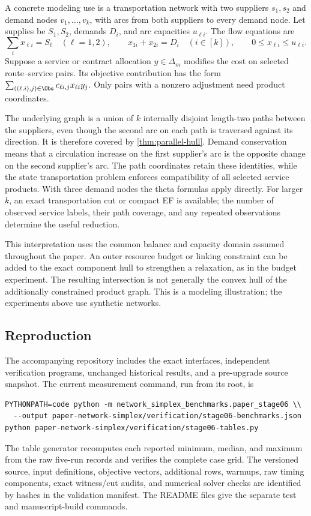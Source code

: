 A concrete modeling use is a transportation network with two suppliers
$s_1,s_2$ and demand nodes $v_1,\ldots,v_k$, with arcs from both suppliers
to every demand node. Let supplies be $S_1,S_2$, demands $D_i$, and
arc capacities $u_{\ell i}$. The flow equations are
\[
 \sum_i x_{\ell i}=S_\ell\quad(\ell=1,2),\qquad
 x_{1i}+x_{2i}=D_i\quad(i\in[k]),\qquad
 0\le x_{\ell i}\le u_{\ell i}.
\]
Suppose a service or contract allocation $y\in\Delta_m$ modifies the
cost on selected route--service pairs. Its objective contribution has the
form $\sum_{((\ell,i),j)\in\Obs}c_{\ell i,j}x_{\ell i}y_j$.
Only pairs with a nonzero adjustment need product coordinates.

The underlying graph is a union of $k$ internally disjoint length-two
paths between the suppliers, even though the second arc on each path is
traversed against its direction. It is therefore covered by
\cref{thm:parallel-hull}. Demand conservation means that a circulation
increase on the first supplier's arc is the opposite change on the second
supplier's arc. The path coordinates retain these identities, while the
state transportation problem enforces compatibility of all selected service
products. With three demand nodes the theta formulas apply directly.
For larger $k$, an exact transportation cut or compact EF is available;
the number of observed service labels, their path coverage, and any repeated
observations determine the useful reduction.

This interpretation uses the common balance and capacity domain assumed
throughout the paper. An outer resource budget or linking constraint can be
added to the exact component hull to strengthen a relaxation, as in the
budget experiment. The resulting intersection is not generally the convex
hull of the additionally constrained product graph. This is a modeling
illustration; the experiments above use synthetic networks.

\subsection{Reproduction}

The accompanying repository includes the exact interfaces, independent
verification programs, unchanged historical results, and a pre-upgrade
source snapshot. The current measurement command, run from its root, is
\begin{verbatim}
PYTHONPATH=code python -m network_simplex_benchmarks.paper_stage06 \\
  --output paper-network-simplex/verification/stage06-benchmarks.json
python paper-network-simplex/verification/stage06-tables.py
\end{verbatim}
The table generator recomputes each reported minimum, median, and maximum
from the raw five-run records and verifies the complete case grid.
The versioned source, input definitions, objective vectors, additional rows,
warmups, raw timing components, exact witness/cut audits, and numerical solver
checks are identified by hashes in the validation manifest. The README files
give the separate test and manuscript-build commands.
